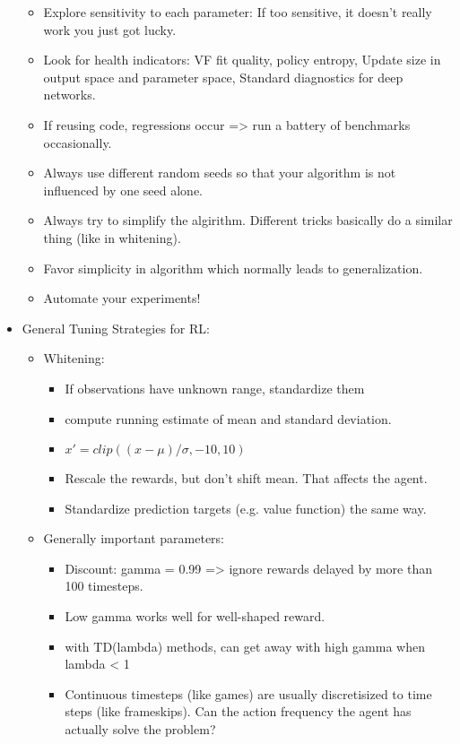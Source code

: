 \begin{itemize}[noitemsep,nolistsep]
\begin{itemize}[noitemsep,nolistsep]
		\item Explore sensitivity to each parameter: If too sensitive, it doesn't really work you just got lucky.
		\item Look for health indicators: VF fit quality, policy entropy, Update size in output space and parameter space, Standard diagnostics for deep networks.
		\item If reusing code, regressions occur => run a battery of benchmarks occasionally.
		\item Always use different random seeds so that your algorithm is not influenced by one seed alone.
		\item Always try to simplify the algirithm. Different tricks basically do a similar thing (like in whitening).
		\item Favor simplicity in algorithm which normally leads to generalization.
		\item Automate your experiments!
	\end{itemize}
	\item General Tuning Strategies for RL:
	\begin{itemize}[noitemsep,nolistsep]
		\item Whitening:
		\begin{itemize}[noitemsep,nolistsep]
			\item If observations have unknown range, standardize them
			\item compute running estimate of mean and standard deviation.
			\item $x' = clip((x-\mu)/\sigma, -10, 10)$
			\item Rescale the rewards, but don't shift mean. That affects the agent.
			\item Standardize prediction targets (e.g. value function) the same way.
		\end{itemize}
		\item Generally important parameters:
		\begin{itemize}[noitemsep,nolistsep]
			\item Discount: gamma = 0.99 => ignore rewards delayed by more than 100 timesteps.
			\item Low gamma works well for well-shaped reward.
			\item with TD(lambda) methods, can get away with high gamma when lambda < 1
			\item Continuous timesteps (like games) are usually discretisized to time steps (like frameskips). Can the action frequency the agent has actually solve the problem?

\end{itemize}
\end{itemize}
\end{itemize}
